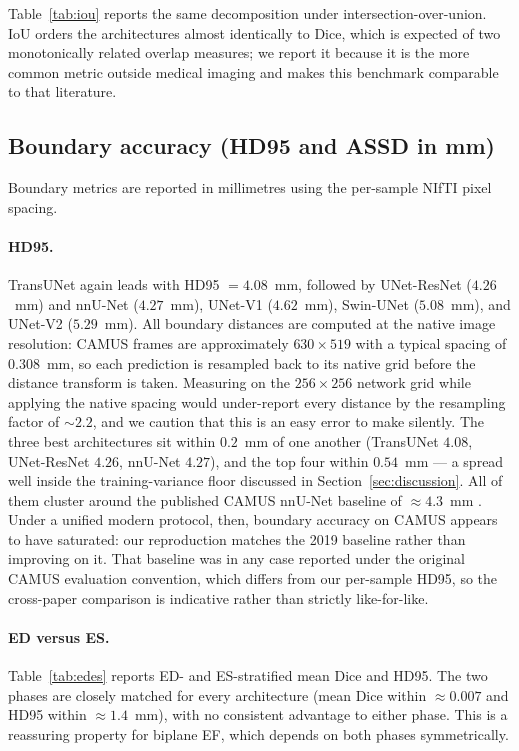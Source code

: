 Table~\ref{tab:iou} reports the same decomposition under intersection-over-union.
IoU orders the architectures almost identically to Dice, which is expected of two
monotonically related overlap measures; we report it because it is the more
common metric outside medical imaging and makes this benchmark comparable to
that literature.



\subsection{Boundary accuracy (HD95 and ASSD in mm)}
\label{sec:results-boundary}

Boundary metrics are reported in millimetres using the per-sample NIfTI
pixel spacing.



\paragraph{HD95.}
TransUNet again leads with HD95 $= 4.08$~mm, followed by UNet-ResNet
($4.26$~mm) and nnU-Net ($4.27$~mm), UNet-V1 ($4.62$~mm), Swin-UNet
($5.08$~mm), and UNet-V2 ($5.29$~mm). All boundary distances are computed
at the native image resolution: CAMUS frames are approximately
$630 \times 519$ with a typical spacing of $0.308$~mm, so each prediction
is resampled back to its native grid before the distance transform is
taken. Measuring on the $256 \times 256$ network grid while applying the
native spacing would under-report every distance by the resampling factor
of $\sim$$2.2$, and we caution that this is an easy error to make silently.
The three best architectures sit within $0.2$~mm of one another
(TransUNet $4.08$, UNet-ResNet $4.26$, nnU-Net $4.27$), and the top four
within $0.54$~mm --- a spread well inside the training-variance floor
discussed in Section~\ref{sec:discussion}. All of them cluster around the
published CAMUS
nnU-Net baseline of $\approx 4.3$~mm \citep{leclerc2019}. Under a unified
modern protocol, then, boundary accuracy on CAMUS appears to have
saturated: our reproduction matches the 2019 baseline rather than
improving on it. That baseline was in any case reported under the original
CAMUS evaluation convention, which differs from our per-sample HD95, so
the cross-paper comparison is indicative rather than strictly
like-for-like.

\paragraph{ED versus ES.}
Table~\ref{tab:edes} reports ED- and ES-stratified mean Dice and HD95. The
two phases are closely matched for every architecture (mean Dice within
$\approx 0.007$ and HD95 within $\approx 1.4$~mm), with no consistent
advantage to either phase. This is a reassuring property for biplane EF, which
depends on both phases symmetrically.

